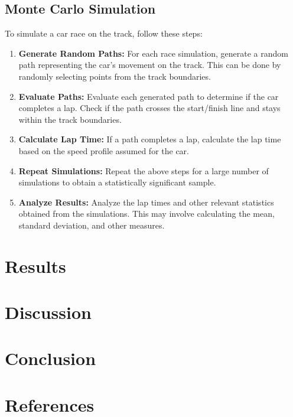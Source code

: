 \documentclass{article}
\begin{document}
\subsection{Monte Carlo Simulation}
To simulate a car race on the track, follow these steps:

\begin{enumerate}
	\item \textbf{Generate Random Paths:} For each race simulation, generate a random path representing the car's movement on the track. This can be done by randomly selecting points from the track boundaries.
	
	\item \textbf{Evaluate Paths:} Evaluate each generated path to determine if the car completes a lap. Check if the path crosses the start/finish line and stays within the track boundaries.
	
	\item \textbf{Calculate Lap Time:} If a path completes a lap, calculate the lap time based on the speed profile assumed for the car.
	
	\item \textbf{Repeat Simulations:} Repeat the above steps for a large number of simulations to obtain a statistically significant sample.
	
	\item \textbf{Analyze Results:} Analyze the lap times and other relevant statistics obtained from the simulations. This may involve calculating the mean, standard deviation, and other measures.
	
\end{enumerate}

\section{Results}

\section{Discussion}

\section{Conclusion}

\section{References}
\end{document}
